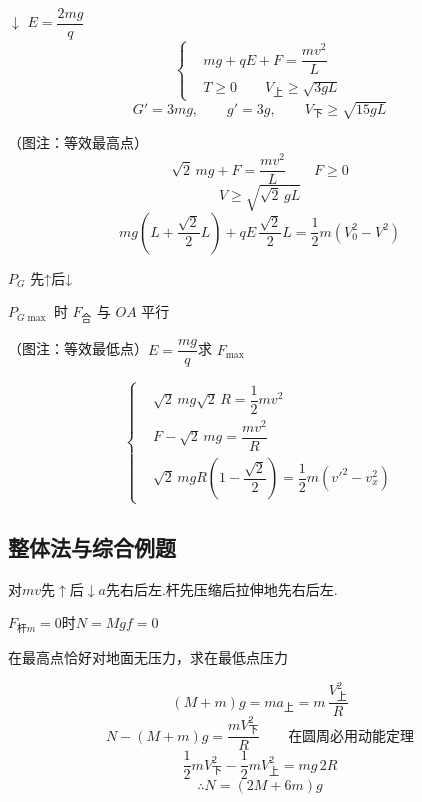 $\downarrow$ $E=\dfrac{2mg}{q}$
\[
\left\{\begin{aligned}
&mg+qE+F=\dfrac{mv^2}{L}\\
&T\ge 0\qquad V_{\text{上}}\ge\sqrt{3gL}
\end{aligned}\right.
\]
\[ G'=3mg,\qquad g'=3g,\qquad V_{\text{下}}\ge\sqrt{15gL} \]

（图注：等效最高点）
\[ \sqrt2\,mg+F=\dfrac{mv^2}{L}\qquad F\ge 0 \]
\[ V\ge\sqrt{\sqrt2\,gL} \]
\[ mg\left(L+\dfrac{\sqrt2}{2}L\right)+qE\,\dfrac{\sqrt2}{2}L=\dfrac12m\left(V_0^2-V^2\right) \]


$P_G$ 先↑后↓

$P_{G\max}$ 时 $F_{\text{合}}$ 与 $OA$ 平行

\begin{problem}
（图注：等效最低点）\quad $E=\dfrac{mg}{q}$\qquad 求 $F_{\max}$
\begin{solution}
\[
\left\{\begin{aligned}
&\sqrt2\,mg\sqrt2\,R=\dfrac12mv^2\\
&F-\sqrt2\,mg=\dfrac{mv^2}{R}\\
&\sqrt2\,mgR\left(1-\dfrac{\sqrt2}{2}\right)=\dfrac12m\left(v'^2-v_x^2\right)
\end{aligned}\right.
\]
\end{solution}
\end{problem}

\subsection{整体法与综合例题}
对$m$\quad $v$先$\uparrow$后$\downarrow$\quad $a$先右后左.\quad 杆先压缩后拉伸\quad 地先右后左.

$F_{\text{杆}m}=0$时\quad $N=Mg$\quad $f=0$

\begin{problem}
在最高点恰好对地面无压力，求在最低点压力
\begin{solution}
\[ (M+m)g=ma_{\text{上}}=m\,\frac{V_{\text{上}}^2}{R} \]
\[ N-(M+m)g=\frac{mV_{\text{下}}^2}{R}\qquad \text{在圆周必用动能定理} \]
\[ \frac12mV_{\text{下}}^2-\frac12mV_{\text{上}}^2=mg\,2R \]
\[ \therefore N=(2M+6m)g \]
\end{solution}
\end{problem}

